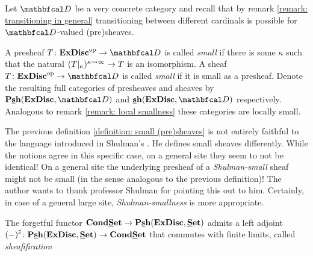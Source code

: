 \begin{definition}
	\label{definition: small (pre)sheaves}
	
	Let $\category{D}$ be a very concrete category and recall that by remark \ref{remark: transitioning in general} transitioning between different cardinals is possible for $\category{D}$-valued (pre)sheaves.
	
	A presheaf $T\colon \extremallyDisconnectedSets^\op\to \category{D}$ is called \emph{small} if there is some $\kappa$ such that the natural $(T{\vert_{\kappa}})^{\kappa\rightsquigarrow \infty}\to T$ is an isomorphism. A sheaf $T\colon \extremallyDisconnectedSets^\op \to \category{D}$ is called \emph{small} if it is small as a presheaf. Denote the resulting full categories of presheaves and sheaves by $\smallPresheaves{\extremallyDisconnectedSets}{\category{D}}$ and $\smallSheaves{\extremallyDisconnectedSets}{\category{D}}$ respectively. Analogous to remark \ref{remark: local smallness} these categories are locally small.
\end{definition}

\begin{remark}
	\label{remark: conflicting terminology}
	
	The previous definition \ref{definition: small (pre)sheaves} is not entirely faithful to the language introduced in Shulman's \cite{shulman2012exactcompletionssmallsheaves}. He defines small sheaves differently. While the notions agree in this specific case, on a general site they seem to not be identical! On a general site the underlying presheaf of a \emph{Shulman-small} sheaf might not be small (in the sense analogous to the previous definition)! The author wants to thank professor Shulman for pointing this out to him. Certainly, in case of a general large site, \emph{Shulman-smallness} is more appropriate.
\end{remark}

\begin{lemma}
	\label{lemma: sheafification of small presheaves}
	
	The forgetful functor $\condensedSets \to \smallPresheaves{\extremallyDisconnectedSets}{\Set}$ admits a left adjoint $\sheafification{-}\colon \smallPresheaves{\extremallyDisconnectedSets}{\Set} \to \condensedSets$ that commutes with finite limits, called \emph{sheafification}
\end{lemma}

